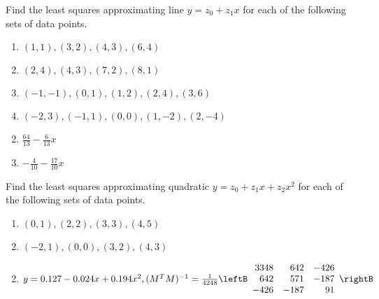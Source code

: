 \begin{multicols}{2}
\begin{ex}
Find the least squares approximating line $y = z_{0} + z_{1}x$ for each of the following sets of data points.

\begin{enumerate}[label={\alph*.}]
\item $(1, 1), (3, 2), (4, 3), (6, 4)$

\item $(2, 4), (4, 3), (7, 2), (8, 1)$

\item $(-1, -1), (0, 1), (1, 2), (2, 4), (3, 6)$

\item $(-2, 3), (-1, 1), (0, 0), (1, -2), (2, -4)$

\end{enumerate}
\begin{sol}
\begin{enumerate}[label={\alph*.}]
\setcounter{enumi}{1}
\item  $ \frac{64}{13} - \frac{6}{13}x $

\setcounter{enumi}{3}
\item  $ -\frac{4}{10} - \frac{17}{10}x $

\end{enumerate}
\end{sol}
\end{ex}

\begin{ex}
Find the least squares approximating quadratic $y = z_{0} + z_{1}x + z_{2}x^{2}$ for each of the following sets of data points.

\begin{enumerate}[label={\alph*.}]
\item $(0, 1), (2, 2), (3, 3), (4, 5)$

\item $(-2, 1), (0, 0), (3, 2), (4, 3)$

\end{enumerate}
\begin{sol}
\begin{enumerate}[label={\alph*.}]
\setcounter{enumi}{1}
\item  $y = 0.127 - 0.024x + 0.194x^{2}, (M^TM)^{-1} = \frac{1}{4248}
\leftB \begin{array}{rrr}
3348 &  642 & -426 \\
 642 &  571 & -187 \\
-426 & -187 &   91
\end{array} \rightB$


\end{enumerate}
\end{sol}
\end{ex}
\end{multicols}
